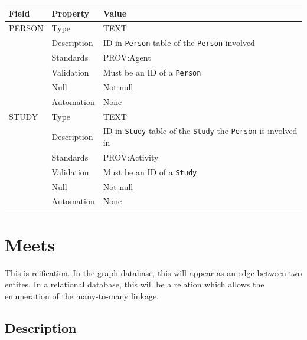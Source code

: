 \documentclass[
]{article}
\newcounter{none} %
\begin{document}
{\def\LTcaptype{none} %
\begin{longtable}[]{@{}
  >{\raggedright\arraybackslash}p{}
  >{\raggedright\arraybackslash}p{}
  >{\raggedright\arraybackslash}p{}@{}}
\toprule\noalign{}
\begin{minipage}[b]{\linewidth}\raggedright
Field
\end{minipage} & \begin{minipage}[b]{\linewidth}\raggedright
Property
\end{minipage} & \begin{minipage}[b]{\linewidth}\raggedright
Value
\end{minipage} \\
\midrule\noalign{}
\endhead
\bottomrule\noalign{}
\endlastfoot
PERSON & Type & TEXT \\
& Description & ID in \texttt{Person} table of the \texttt{Person}
involved \\
& Standards & PROV:Agent \\
& Validation & Must be an ID of a \texttt{Person} \\
& Null & Not null \\
& Automation & None \\
STUDY & Type & TEXT \\
& Description & ID in \texttt{Study} table of the \texttt{Study} the
\texttt{Person} is involved in \\
& Standards & PROV:Activity \\
& Validation & Must be an ID of a \texttt{Study} \\
& Null & Not null \\
& Automation & None \\
\end{longtable}
}

\section{Meets}\label{meets}

This is reification. In the graph database, this will appear as an edge
between two entites. In a relational database, this will be a relation
which allows the enumeration of the many-to-many linkage.

\subsection{Description}\label{description-17}
\end{document}
